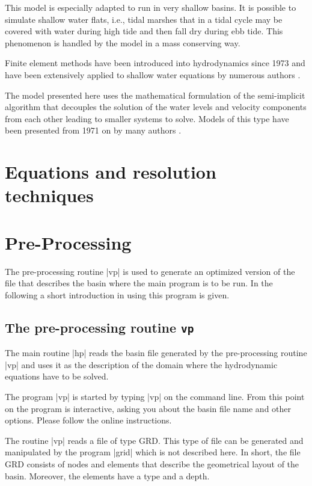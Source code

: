 \documentclass{report}
\begin{document}
This model is especially adapted to run in very shallow basins. It is
possible to simulate shallow water flats, i.e., tidal marshes that in a
tidal cycle may be covered with water during high tide and then fall
dry during ebb tide. This phenomenon is handled by the model in a mass
conserving way.

Finite element methods have been introduced into hydrodynamics since
1973 and have been extensively applied to shallow water equations by
numerous authors \cite{Grotkop73, Taylor75, Herrling77, Herrling78, Holz82}.

The model presented here \cite{Umgies86, Umgies93} uses the mathematical
formulation of the semi-implicit algorithm that decouples the solution
of the water levels and velocity components from each other leading to
smaller systems to solve. Models of this type have been presented from
1971 on by many authors \cite{Kwizak71, Duwe82, Backhaus83}.



\chapter{Equations and resolution techniques}



\chapter{Pre-Processing}


The pre-processing routine |vp| is used to generate an
optimized version of the file that describes the basin
where the main program is to be run. In the following a
short introduction in using this program is given.

\section{The pre-processing routine {\tt vp}}

The main routine |hp| reads the basin file generated by
the pre-processing routine |vp| and uses it as the description
of the domain where the hydrodynamic equations have to be
solved.

The program |vp| is started by typing |vp| on the command line.
From this point on the program is interactive, asking you about
the basin file name and other options. Please follow the online
instructions.

The routine |vp| reads a file of type GRD. This type of file
can be generated and manipulated by the program |grid| which
is not described here. In short, the file GRD consists of
nodes and elements that describe the geometrical layout
of the basin. Moreover, the elements have a type and a depth.
\end{document}
